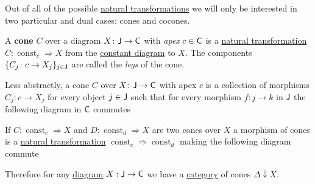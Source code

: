\documentclass[../../main]{subfiles}
\begin{document}
Out of all of the possible \hyperref[def:natural-transformation]{natural transformations} we will only be interested in two particular and dual cases: cones and cocones.
\begin{definition}[Cone]\label{def:cone}
  A \textbf{cone} \(C\) over a diagram \(X\colon \mathsf{J} \to \mathsf{C}\) with \textit{apex} \(c \in \mathsf{C}\) is a \hyperref[def:natural-transformation]{natural transformation} \(C\colon \operatorname{const}_{c} \Rightarrow X\) from the \hyperref[ex:constant-diagram]{constant diagram} to \(X\).
  The components \(\{C_{j}\colon c \to X_{j}\}_{j \in \mathsf{J}}\) are called the \textit{legs} of the cone.

  Less abstractly, a cone \(C\) over \(X\colon \mathsf{J} \to \mathsf{C}\) with apex \(c\) is a collection of morphisms \(C_{j}\colon c \to X_{j}\) for every object \(j \in \mathsf{J}\)  such that for every morphism \(f: j \to k\) in \(\mathsf{J}\) the following diagram in \(\mathsf{C}\) commutes
  \begin{center}
  \end{center}

  If \(C\colon \operatorname{const}_{c} \Rightarrow X\) and \(D\colon \operatorname{const}_{d} \Rightarrow X\) are two cones over \(X\) a morphism of cones is a \hyperref[def:natural-transformation]{natural transformation} \(\operatorname{const}_{c} \Rightarrow \operatorname{const}_{d}\) making the following diagram commute
  \begin{center}
  \end{center}
  Therefore for any \hyperref[def:diagram]{diagram} \(X: \mathsf{J} \to \mathsf{C}\) we have a \hyperref[def:category]{category} of cones \(\Delta \downarrow X\).
\end{definition}
\end{document}
